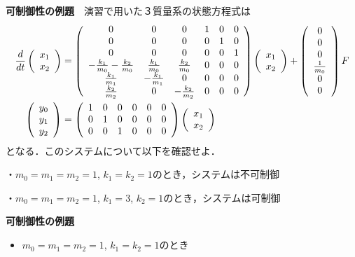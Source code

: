 \documentclass[a4paper,11pt,fleqn]{jreport}
\begin{document}
\noindent
{\bf 可制御性の例題}　演習で用いた３質量系の状態方程式は
\begin{align}
 \frac{d}{dt} \left ( \begin{array}{c} x_1 \\ x_2 \end{array} \right )
 &=
 \left(\begin{array}{cccccc}
        0 & 0 & 0 & 1 & 0 & 0      \\
        0 & 0 & 0 & 0 & 1 & 0      \\
        0 & 0 & 0 & 0 & 0 & 1      \\
	-\frac{k_1}{m_0} -\frac{k_2}{m_0}&  \frac{k_1}{m_0} &  \frac{k_2}{m_0} & 0 & 0 & 0 \\
	 \frac{k_1}{m_1}                & -\frac{k_1}{m_1} &  0               & 0 & 0 & 0 \\
	 \frac{k_2}{m_2}                &  0               & -\frac{k_2}{m_2} & 0 & 0 & 0 
       \end{array}\right)
 \left ( \begin{array}{c} x_1 \\ x_2 \end{array} \right )
 +
 \left(\begin{array}{c}
        0 \\
        0 \\
        0 \\
	    \frac{1}{m_0} \\
	    0 \\
	    0 
       \end{array}\right)
        F
\nonumber
\\
 \left(\begin{array}{c}
	    y_0 \\
		y_1 \\
		y_2
       \end{array}\right)
 &=
 \left(\begin{array}{cccccc}
         1 & 0 & 0 & 0 & 0 & 0  \\
         0 & 1 & 0 & 0 & 0 & 0 \\
         0 & 0 & 1 & 0 & 0 & 0 \\
       \end{array}\right)
 \left ( \begin{array}{c} x_1 \\ x_2 \end{array} \right )
\nonumber
\end{align}
となる．このシステムについて以下を確認せよ．

・$m_0=m_1=m_2=1$, $k_1=k_2=1$のとき，システムは不可制御

・$m_0=m_1=m_2=1$, $k_1=3$, $k_2=1$のとき，システムは可制御

\newpage
\noindent
{\bf 可制御性の例題}

\begin{itemize}
\item $m_0=m_1=m_2=1$, $k_1=k_2=1$のとき
\end{itemize}
\end{document}
